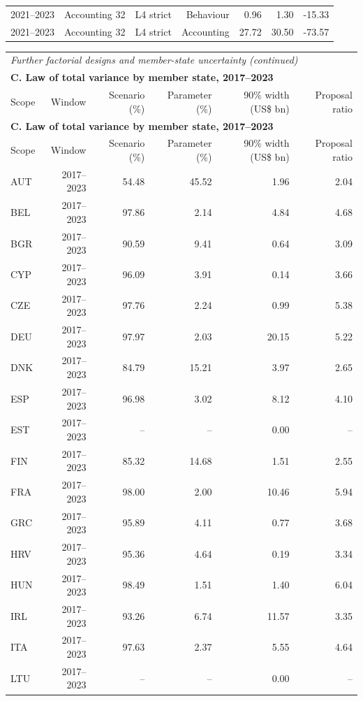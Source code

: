 {\begin{longtable}{@{}lrrrrrr@{}}
2021–2023 & Accounting 32 & L4 strict & Behaviour &  0.96 &  1.30 &  -15.33 \\
2021–2023 & Accounting 32 & L4 strict & Accounting & 27.72 & 30.50 &  -73.57 \\
\end{longtable}
\addtocounter{table}{-1}
\begin{longtable}{@{}lrrrrr@{}}
\multicolumn{6}{l}{\textit{Further factorial designs and member-state uncertainty (continued)}} \\
\multicolumn{6}{l}{\textbf{C. Law of total variance by member state, 2017–2023}} \\
\toprule
Scope & Window & Scenario (\%) & Parameter (\%) & 90\% width (US\$ bn) & Proposal ratio \\
\midrule
\endfirsthead
\multicolumn{6}{l}{\textbf{C. Law of total variance by member state, 2017–2023}} \\
\toprule
Scope & Window & Scenario (\%) & Parameter (\%) & 90\% width (US\$ bn) & Proposal ratio \\
\midrule
\endhead
\midrule
\endfoot
\bottomrule
\endlastfoot
AUT & 2017–2023 & 54.48 & 45.52 &  1.96 &  2.04 \\
BEL & 2017–2023 & 97.86 &  2.14 &  4.84 &  4.68 \\
BGR & 2017–2023 & 90.59 &  9.41 &  0.64 &  3.09 \\
CYP & 2017–2023 & 96.09 &  3.91 &  0.14 &  3.66 \\
CZE & 2017–2023 & 97.76 &  2.24 &  0.99 &  5.38 \\
DEU & 2017–2023 & 97.97 &  2.03 & 20.15 &  5.22 \\
DNK & 2017–2023 & 84.79 & 15.21 &  3.97 &  2.65 \\
ESP & 2017–2023 & 96.98 &  3.02 &  8.12 &  4.10 \\
EST & 2017–2023 & -- & -- &  0.00 & -- \\
FIN & 2017–2023 & 85.32 & 14.68 &  1.51 &  2.55 \\
FRA & 2017–2023 & 98.00 &  2.00 & 10.46 &  5.94 \\
GRC & 2017–2023 & 95.89 &  4.11 &  0.77 &  3.68 \\
HRV & 2017–2023 & 95.36 &  4.64 &  0.19 &  3.34 \\
HUN & 2017–2023 & 98.49 &  1.51 &  1.40 &  6.04 \\
IRL & 2017–2023 & 93.26 &  6.74 & 11.57 &  3.35 \\
ITA & 2017–2023 & 97.63 &  2.37 &  5.55 &  4.64 \\
LTU & 2017–2023 & -- & -- &  0.00 & -- \\

\end{longtable}}
